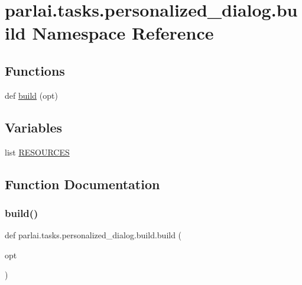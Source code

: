 \hypertarget{namespaceparlai_1_1tasks_1_1personalized__dialog_1_1build}{}\section{parlai.\+tasks.\+personalized\+\_\+dialog.\+build Namespace Reference}
\label{namespaceparlai_1_1tasks_1_1personalized__dialog_1_1build}
\subsection*{Functions}
\begin{DoxyCompactItemize}
\item 
def \hyperlink{namespaceparlai_1_1tasks_1_1personalized__dialog_1_1build_a8e2486f9cfd8af50e1da077ea5ed7c5e}{build} (opt)
\end{DoxyCompactItemize}
\subsection*{Variables}
\begin{DoxyCompactItemize}
\item 
list \hyperlink{namespaceparlai_1_1tasks_1_1personalized__dialog_1_1build_abc1c81a7a5fdba4b1ea9c6bfecaa9300}{R\+E\+S\+O\+U\+R\+C\+ES}
\end{DoxyCompactItemize}


\subsection{Function Documentation}
\mbox{\label{namespaceparlai_1_1tasks_1_1personalized__dialog_1_1build_a8e2486f9cfd8af50e1da077ea5ed7c5e}} 
\subsubsection{\texorpdfstring{build()}{build()}}
{\footnotesize\ttfamily def parlai.\+tasks.\+personalized\+\_\+dialog.\+build.\+build (\begin{DoxyParamCaption}\item[{}]{opt }\end{DoxyParamCaption})}




